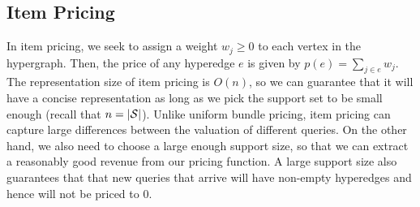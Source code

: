 
%


\subsection{Item Pricing} 

In item pricing, we seek to assign a weight $w_j \geq 0$ to each vertex in the hypergraph. 
Then, the price of any hyperedge $e$ is given by $p(e) = \sum_{j \in e} w_j$. The representation size of item pricing is $O(n)$, so we can guarantee that it will have a 
concise representation as long as we pick the support set to be small enough (recall that $n = |\mathcal{S}|$). Unlike uniform bundle pricing, item pricing can capture large differences between
the valuation of different queries. On the other hand, we also need to choose a large enough support size, so that we can extract a reasonably good revenue from our pricing
function. A large support size also guarantees that that new queries that arrive will have
non-empty hyperedges and hence will not be priced to 0. 

